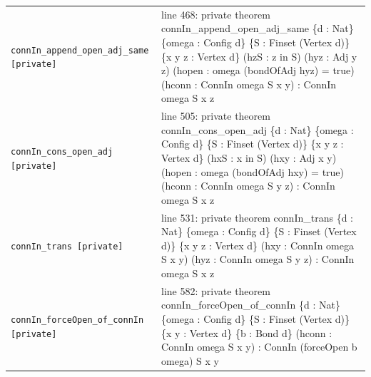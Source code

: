 \documentclass[10pt]{article}
\begin{document}
\begin{longtable}{>{\raggedright\arraybackslash}p{} >{\raggedright\arraybackslash}p{}}
\texttt{connIn\_\allowbreak{}append\_\allowbreak{}open\_\allowbreak{}adj\_\allowbreak{}same [private]} & {\ttfamily\scriptsize line 468:\allowbreak{} private theorem connIn\_\allowbreak{}append\_\allowbreak{}open\_\allowbreak{}adj\_\allowbreak{}same \{d :\allowbreak{} Nat\} \{omega :\allowbreak{} Config d\} \{S :\allowbreak{} Finset (\allowbreak{}Vertex d)\allowbreak{}\} \{x y z :\allowbreak{} Vertex d\} (\allowbreak{}hzS :\allowbreak{} z in S)\allowbreak{} (\allowbreak{}hyz :\allowbreak{} Adj y z)\allowbreak{} (\allowbreak{}hopen :\allowbreak{} omega (\allowbreak{}bondOfAdj hyz)\allowbreak{} =\allowbreak{} true)\allowbreak{} (\allowbreak{}hconn :\allowbreak{} ConnIn omega S x y)\allowbreak{} :\allowbreak{} ConnIn omega S x z} \\[0.45em]
\texttt{connIn\_\allowbreak{}cons\_\allowbreak{}open\_\allowbreak{}adj [private]} & {\ttfamily\scriptsize line 505:\allowbreak{} private theorem connIn\_\allowbreak{}cons\_\allowbreak{}open\_\allowbreak{}adj \{d :\allowbreak{} Nat\} \{omega :\allowbreak{} Config d\} \{S :\allowbreak{} Finset (\allowbreak{}Vertex d)\allowbreak{}\} \{x y z :\allowbreak{} Vertex d\} (\allowbreak{}hxS :\allowbreak{} x in S)\allowbreak{} (\allowbreak{}hxy :\allowbreak{} Adj x y)\allowbreak{} (\allowbreak{}hopen :\allowbreak{} omega (\allowbreak{}bondOfAdj hxy)\allowbreak{} =\allowbreak{} true)\allowbreak{} (\allowbreak{}hconn :\allowbreak{} ConnIn omega S y z)\allowbreak{} :\allowbreak{} ConnIn omega S x z} \\[0.45em]
\texttt{connIn\_\allowbreak{}trans [private]} & {\ttfamily\scriptsize line 531:\allowbreak{} private theorem connIn\_\allowbreak{}trans \{d :\allowbreak{} Nat\} \{omega :\allowbreak{} Config d\} \{S :\allowbreak{} Finset (\allowbreak{}Vertex d)\allowbreak{}\} \{x y z :\allowbreak{} Vertex d\} (\allowbreak{}hxy :\allowbreak{} ConnIn omega S x y)\allowbreak{} (\allowbreak{}hyz :\allowbreak{} ConnIn omega S y z)\allowbreak{} :\allowbreak{} ConnIn omega S x z} \\[0.45em]
\texttt{connIn\_\allowbreak{}forceOpen\_\allowbreak{}of\_\allowbreak{}connIn [private]} & {\ttfamily\scriptsize line 582:\allowbreak{} private theorem connIn\_\allowbreak{}forceOpen\_\allowbreak{}of\_\allowbreak{}connIn \{d :\allowbreak{} Nat\} \{omega :\allowbreak{} Config d\} \{S :\allowbreak{} Finset (\allowbreak{}Vertex d)\allowbreak{}\} \{x y :\allowbreak{} Vertex d\} \{b :\allowbreak{} Bond d\} (\allowbreak{}hconn :\allowbreak{} ConnIn omega S x y)\allowbreak{} :\allowbreak{} ConnIn (\allowbreak{}forceOpen b omega)\allowbreak{} S x y} \\[0.45em]

\end{longtable}
\end{document}
